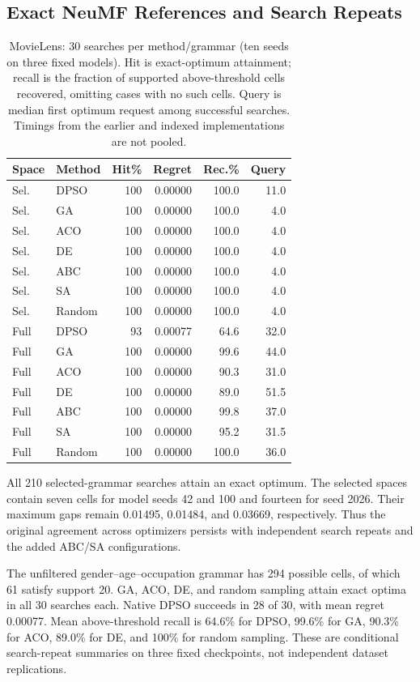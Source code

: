 \documentclass[sigconf,nonacm]{acmart}
\begin{document}
\subsection{Exact NeuMF References and Search Repeats}
\begin{table}[t]
\centering
\caption{MovieLens: 30 searches per method/grammar (ten seeds on three fixed models). Hit is exact-optimum attainment; recall is the fraction of supported above-threshold cells recovered, omitting cases with no such cells. Query is median first optimum request among successful searches. Timings from the earlier and indexed implementations are not pooled.}
\label{tab:extended-neumf}
\small
\begin{tabular}{llrrrr}
\toprule
Space & Method & Hit\% & Regret & Rec.\% & Query \\
\midrule
Sel. & DPSO & 100 & 0.00000 & 100.0 & 11.0 \\
Sel. & GA & 100 & 0.00000 & 100.0 & 4.0 \\
Sel. & ACO & 100 & 0.00000 & 100.0 & 4.0 \\
Sel. & DE & 100 & 0.00000 & 100.0 & 4.0 \\
Sel. & ABC & 100 & 0.00000 & 100.0 & 4.0 \\
Sel. & SA & 100 & 0.00000 & 100.0 & 4.0 \\
Sel. & Random & 100 & 0.00000 & 100.0 & 4.0 \\
Full & DPSO & 93 & 0.00077 & 64.6 & 32.0 \\
Full & GA & 100 & 0.00000 & 99.6 & 44.0 \\
Full & ACO & 100 & 0.00000 & 90.3 & 31.0 \\
Full & DE & 100 & 0.00000 & 89.0 & 51.5 \\
Full & ABC & 100 & 0.00000 & 99.8 & 37.0 \\
Full & SA & 100 & 0.00000 & 95.2 & 31.5 \\
Full & Random & 100 & 0.00000 & 100.0 & 36.0 \\
\bottomrule
\end{tabular}
\end{table}

All 210 selected-grammar searches attain an exact optimum. The selected spaces contain seven cells for model seeds 42 and 100 and fourteen for seed 2026. Their maximum gaps remain 0.01495, 0.01484, and 0.03669, respectively. Thus the original agreement across optimizers persists with independent search repeats and the added ABC/SA configurations.

The unfiltered gender--age--occupation grammar has 294 possible cells, of which 61 satisfy support 20. GA, ACO, DE, and random sampling attain exact optima in all 30 searches each. Native DPSO succeeds in 28 of 30, with mean regret 0.00077. Mean above-threshold recall is 64.6\% for DPSO, 99.6\% for GA, 90.3\% for ACO, 89.0\% for DE, and 100\% for random sampling. These are conditional search-repeat summaries on three fixed checkpoints, not independent dataset replications.
\end{document}
